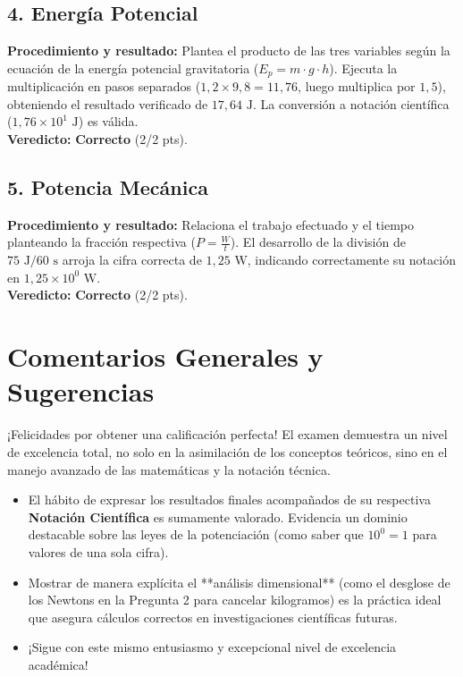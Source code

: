 \documentclass[12pt,letterpaper]{article}
\begin{document}
\subsection*{4. Energía Potencial}
\textbf{Procedimiento y resultado:} Plantea el producto de las tres variables según la ecuación de la energía potencial gravitatoria ($E_p = m \cdot g \cdot h$). Ejecuta la multiplicación en pasos separados ($1,2 \times 9,8 = 11,76$, luego multiplica por $1,5$), obteniendo el resultado verificado de $17,64 \text{ J}$. La conversión a notación científica ($1,76 \times 10^1 \text{ J}$) es válida. \\
\textbf{Veredicto:} \textbf{Correcto} (2/2 pts).

\subsection*{5. Potencia Mecánica}
\textbf{Procedimiento y resultado:} Relaciona el trabajo efectuado y el tiempo planteando la fracción respectiva ($P = \frac{W}{t}$). El desarrollo de la división de $75 \text{ J} / 60 \text{ s}$ arroja la cifra correcta de $1,25 \text{ W}$, indicando correctamente su notación en $1,25 \times 10^0 \text{ W}$. \\
\textbf{Veredicto:} \textbf{Correcto} (2/2 pts).

\vspace{0.5cm}
\section*{Comentarios Generales y Sugerencias}
¡Felicidades por obtener una calificación perfecta! El examen demuestra un nivel de excelencia total, no solo en la asimilación de los conceptos teóricos, sino en el manejo avanzado de las matemáticas y la notación técnica.
\begin{itemize}
    \item El hábito de expresar los resultados finales acompañados de su respectiva \textbf{Notación Científica} es sumamente valorado. Evidencia un dominio destacable sobre las leyes de la potenciación (como saber que $10^0 = 1$ para valores de una sola cifra).
    \item Mostrar de manera explícita el **análisis dimensional** (como el desglose de los Newtons en la Pregunta 2 para cancelar kilogramos) es la práctica ideal que asegura cálculos correctos en investigaciones científicas futuras.
    \item ¡Sigue con este mismo entusiasmo y excepcional nivel de excelencia académica!
\end{itemize}
\end{document}
